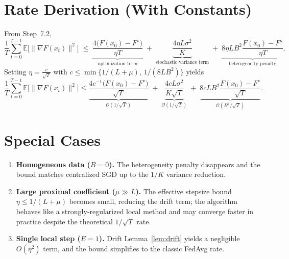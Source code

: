\documentclass{article}
\newcommand{\E}{\mathbb{E}}
\begin{document}
\section*{Rate Derivation (With Constants)}
From Step~7.2,
\[
\boxed{
\frac{1}{T}\sum_{t=0}^{T-1}\E\!\bigl[\|\nabla F(x_t)\|^{2}\bigr]
\;\le\;
\underbrace{\frac{4\bigl(F(x_0)-F^{\star}\bigr)}{\eta T}}_{\text{optimization term}}
\;+\;
\underbrace{\frac{4\eta L\sigma^{2}}{K}}_{\text{stochastic variance term}}
\;+\;
\underbrace{8\eta L B^{2}\frac{F(x_0)-F^{\star}}{\eta T}}_{\text{heterogeneity penalty}} .
}
\]
Setting $\eta = \frac{c}{\sqrt{T}}$ with $c\le \min\{1/(L+\mu),\,1/(8LB^{2})\}$ yields
\[
\frac{1}{T}\sum_{t=0}^{T-1}\E\!\bigl[\|\nabla F(x_t)\|^{2}\bigr]
\le
\underbrace{\frac{4c^{-1}\bigl(F(x_0)-F^{\star}\bigr)}{\sqrt{T}}}_{\mathcal{O}(1/\sqrt{T})}
\;+\;
\underbrace{\frac{4cL\sigma^{2}}{K\sqrt{T}}}_{\mathcal{O}(1/\sqrt{T})}
\;+\;
\underbrace{8cL B^{2}\frac{F(x_0)-F^{\star}}{\sqrt{T}}}_{\mathcal{O}(B^{2}/\sqrt{T})}.
\]

\section*{Special Cases}
\begin{enumerate}[leftmargin=*]
    \item \textbf{Homogeneous data ($B=0$).} The heterogeneity penalty disappears and the bound matches centralized SGD up to the $1/K$ variance reduction.
    \item \textbf{Large proximal coefficient ($\mu\gg L$).} The effective stepsize bound $\eta\le 1/(L+\mu)$ becomes small, reducing the drift term; the algorithm behaves like a strongly‑regularized local method and may converge faster in practice despite the theoretical $1/\sqrt{T}$ rate.
    \item \textbf{Single local step ($E=1$).} Drift Lemma~\ref{lem:drift} yields a negligible $O(\eta^{2})$ term, and the bound simplifies to the classic FedAvg rate.
\end{enumerate}

\end{document}
